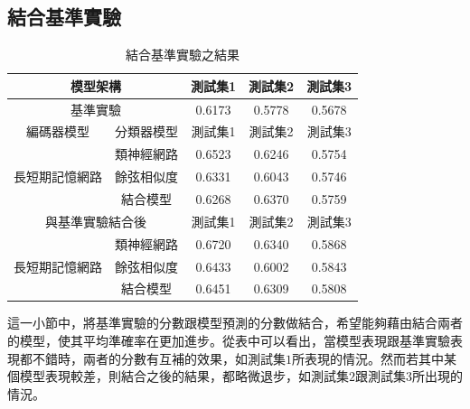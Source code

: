 \subsection{結合基準實驗}
\begin{table}[ht]
	 \centering
	 \caption{結合基準實驗之結果}
	 \label{table:ch3_late_fusion}
	 \begin{tabular}{|c|c|c|c|c|}
		 \hline
		 \multicolumn{2}{|c|}{模型架構} & 測試集1 & 測試集2 & 測試集3 \\
		 \hline
		 \multicolumn{2}{|c|}{基準實驗} & 0.6173 & 0.5778 & 0.5678\\
		 \hline
		 \hline 
		 編碼器模型 & 分類器模型 & 測試集1 &測試集2 & 測試集3 \\
		 \hline
		 \multirow{3}{*}{長短期記憶網路} & 類神經網路 &
		 0.6523 &0.6246 & 0.5754 \\
		 \cline{2-5}
		 & 餘弦相似度& 0.6331 & 0.6043 & 0.5746 \\
		 \cline{2-5}
		 & 結合模型 & 0.6268 & 0.6370 & 0.5759 \\ 
		 \hline
		 \hline
		 \multicolumn{2}{|c|}{與基準實驗結合後} & 測試集1 &測試集2
		 &測試集3 \\
		 \hline
		 \multirow{3}{*}{長短期記憶網路} & 類神經網路 &
		 {\color{red}0.6720} & 0.6340 & 0.5868\\
		 \cline{2-5}
		 & 餘弦相似度& 0.6433&0.6002&0.5843 \\
		 \cline{2-5}
		 & 結合模型 &0.6451&0.6309	&0.5808 \\
		 \hline
	   \end{tabular}
\end{table}

這一小節中，將基準實驗的分數跟模型預測的分數做結合，希望能夠藉由結合兩者的模型，使其平均準確率在更加進步。從表中可以看出，當模型表現跟基準實驗表現都不錯時，兩者的分數有互補的效果，如測試集$1$所表現的情況。然而若其中某個模型表現較差，則結合之後的結果，都略微退步，如測試集$2$跟測試集$3$所出現的情況。
